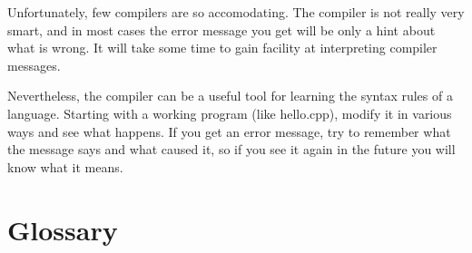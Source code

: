 Unfortunately, few compilers are so accomodating.  The compiler
is not really very smart, and in most cases the error message
you get will be only a hint about what is wrong.  It will take
some time to gain facility at interpreting compiler messages.

Nevertheless, the compiler can be a useful tool for learning the
syntax rules of a language.  Starting with a working program
(like hello.cpp), modify it in various ways and see what happens.
If you get an error message, try to remember what the message says
and what caused it, so if you see it again in the future you
will know what it means.

\section{Glossary}

